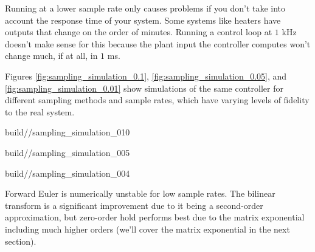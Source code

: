 Running at a lower sample rate only causes problems if you don't take into
account the response time of your \gls{system}. Some \glspl{system} like heaters
have \glspl{output} that change on the order of minutes. Running a control loop
at $1$ kHz doesn't make sense for this because the \gls{plant} \gls{input} the
controller computes won't change much, if at all, in $1$ ms.

Figures \ref{fig:sampling_simulation_0.1}, \ref{fig:sampling_simulation_0.05},
and \ref{fig:sampling_simulation_0.01} show simulations of the same controller
for different sampling methods and sample rates, which have varying levels of
fidelity to the real \gls{system}.
\begin{bookfigure}
  \begin{minisvg}{2}{build/\chapterpath/sampling_simulation_010}
    \caption{Sampling methods for system simulation with $T = 0.1$ s}
    \label{fig:sampling_simulation_0.1}
  \end{minisvg}
  \hfill
  \begin{minisvg}{2}{build/\chapterpath/sampling_simulation_005}
    \caption{Sampling methods for system simulation with $T = 0.05$ s}
    \label{fig:sampling_simulation_0.05}
  \end{minisvg}
  \hfill
  \begin{minisvg}{2}{build/\chapterpath/sampling_simulation_004}
    \caption{Sampling methods for system simulation with $T = 0.01$ s}
    \label{fig:sampling_simulation_0.01}
  \end{minisvg}
\end{bookfigure}

Forward Euler is numerically unstable for low sample rates. The bilinear
transform is a significant improvement due to it being a second-order
approximation, but zero-order hold performs best due to the matrix exponential
including much higher orders (we'll cover the matrix exponential in the next
section).
